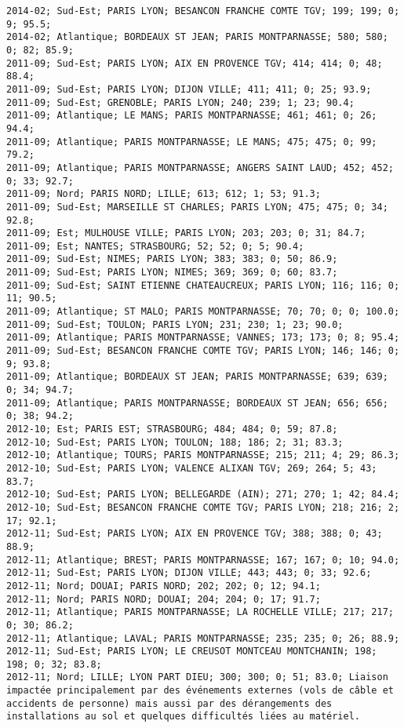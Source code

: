 \documentclass{article}
\begin{document}
\begin{Verbatim}[commandchars=\\\{\}]
2014-02; Sud-Est; PARIS LYON; BESANCON FRANCHE COMTE TGV; 199; 199; 0; 9; 95.5; 
2014-02; Atlantique; BORDEAUX ST JEAN; PARIS MONTPARNASSE; 580; 580; 0; 82; 85.9; 
2011-09; Sud-Est; PARIS LYON; AIX EN PROVENCE TGV; 414; 414; 0; 48; 88.4; 
2011-09; Sud-Est; PARIS LYON; DIJON VILLE; 411; 411; 0; 25; 93.9; 
2011-09; Sud-Est; GRENOBLE; PARIS LYON; 240; 239; 1; 23; 90.4; 
2011-09; Atlantique; LE MANS; PARIS MONTPARNASSE; 461; 461; 0; 26; 94.4; 
2011-09; Atlantique; PARIS MONTPARNASSE; LE MANS; 475; 475; 0; 99; 79.2; 
2011-09; Atlantique; PARIS MONTPARNASSE; ANGERS SAINT LAUD; 452; 452; 0; 33; 92.7; 
2011-09; Nord; PARIS NORD; LILLE; 613; 612; 1; 53; 91.3; 
2011-09; Sud-Est; MARSEILLE ST CHARLES; PARIS LYON; 475; 475; 0; 34; 92.8; 
2011-09; Est; MULHOUSE VILLE; PARIS LYON; 203; 203; 0; 31; 84.7; 
2011-09; Est; NANTES; STRASBOURG; 52; 52; 0; 5; 90.4; 
2011-09; Sud-Est; NIMES; PARIS LYON; 383; 383; 0; 50; 86.9; 
2011-09; Sud-Est; PARIS LYON; NIMES; 369; 369; 0; 60; 83.7; 
2011-09; Sud-Est; SAINT ETIENNE CHATEAUCREUX; PARIS LYON; 116; 116; 0; 11; 90.5; 
2011-09; Atlantique; ST MALO; PARIS MONTPARNASSE; 70; 70; 0; 0; 100.0; 
2011-09; Sud-Est; TOULON; PARIS LYON; 231; 230; 1; 23; 90.0; 
2011-09; Atlantique; PARIS MONTPARNASSE; VANNES; 173; 173; 0; 8; 95.4; 
2011-09; Sud-Est; BESANCON FRANCHE COMTE TGV; PARIS LYON; 146; 146; 0; 9; 93.8; 
2011-09; Atlantique; BORDEAUX ST JEAN; PARIS MONTPARNASSE; 639; 639; 0; 34; 94.7; 
2011-09; Atlantique; PARIS MONTPARNASSE; BORDEAUX ST JEAN; 656; 656; 0; 38; 94.2; 
2012-10; Est; PARIS EST; STRASBOURG; 484; 484; 0; 59; 87.8; 
2012-10; Sud-Est; PARIS LYON; TOULON; 188; 186; 2; 31; 83.3; 
2012-10; Atlantique; TOURS; PARIS MONTPARNASSE; 215; 211; 4; 29; 86.3; 
2012-10; Sud-Est; PARIS LYON; VALENCE ALIXAN TGV; 269; 264; 5; 43; 83.7; 
2012-10; Sud-Est; PARIS LYON; BELLEGARDE (AIN); 271; 270; 1; 42; 84.4; 
2012-10; Sud-Est; BESANCON FRANCHE COMTE TGV; PARIS LYON; 218; 216; 2; 17; 92.1; 
2012-11; Sud-Est; PARIS LYON; AIX EN PROVENCE TGV; 388; 388; 0; 43; 88.9; 
2012-11; Atlantique; BREST; PARIS MONTPARNASSE; 167; 167; 0; 10; 94.0; 
2012-11; Sud-Est; PARIS LYON; DIJON VILLE; 443; 443; 0; 33; 92.6; 
2012-11; Nord; DOUAI; PARIS NORD; 202; 202; 0; 12; 94.1; 
2012-11; Nord; PARIS NORD; DOUAI; 204; 204; 0; 17; 91.7; 
2012-11; Atlantique; PARIS MONTPARNASSE; LA ROCHELLE VILLE; 217; 217; 0; 30; 86.2; 
2012-11; Atlantique; LAVAL; PARIS MONTPARNASSE; 235; 235; 0; 26; 88.9; 
2012-11; Sud-Est; PARIS LYON; LE CREUSOT MONTCEAU MONTCHANIN; 198; 198; 0; 32; 83.8; 
2012-11; Nord; LILLE; LYON PART DIEU; 300; 300; 0; 51; 83.0; Liaison impactée principalement par des événements externes (vols de câble et accidents de personne) mais aussi par des dérangements des installations au sol et quelques difficultés liées au matériel.

\end{Verbatim}
\end{document}
